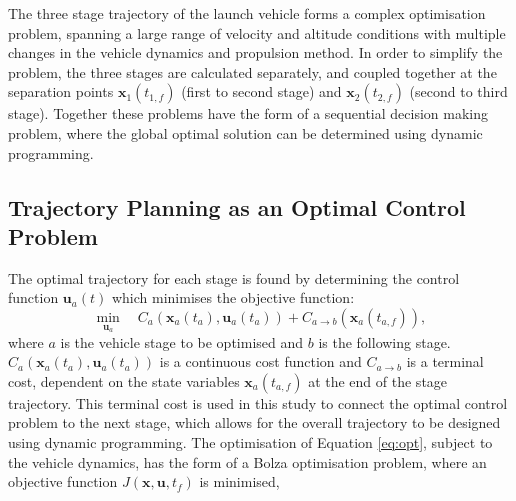 \documentclass[journal]{new-aiaa}
\begin{document}
The three stage trajectory of the launch vehicle forms a complex optimisation problem, spanning a large range of velocity and altitude conditions with multiple changes in the vehicle dynamics and propulsion method. In order to simplify the problem, the three stages are calculated separately, and coupled together at the separation points $\textbf{x}_1(t_{1,f})$ (first to second stage) and  $\textbf{x}_2(t_{2,f})$ (second to third stage). Together these problems have the form of a sequential decision making problem, where the global optimal solution can be determined using dynamic programming\cite{Bertsekas2005}. 



\subsection{Trajectory Planning as an Optimal Control Problem}

 The optimal trajectory for each stage is found by determining the control function $\textbf{u}_a(t)$ which minimises the objective function:
\begin{equation} \label{eq:opt}
\min\limits_{\textbf{u}_a} \quad C_a(\textbf{x}_a(t_a),\textbf{u}_a(t_a)) + C_{a\rightarrow  b}(\textbf{x}_a(t_{a,f})),
\end{equation}
where $a$ is the vehicle stage to be optimised and $b$ is the following stage. $ C_a(\textbf{x}_a(t_a),\textbf{u}_a(t_a))$ is a continuous cost function and $C_{{a\rightarrow b}}$ is a terminal cost, dependent on the state variables $\textbf{x}_a(t_{a,f})$ at the end of the stage trajectory. This terminal cost is used in this study to connect the optimal control problem to the next stage, which allows for the overall trajectory to be designed using dynamic programming.
The optimisation of Equation \ref{eq:opt}, subject to the vehicle dynamics, has the form of a Bolza optimisation problem, where an objective function $J(\textbf{x},\textbf{u},t_f)$ is minimised,
\end{document}
